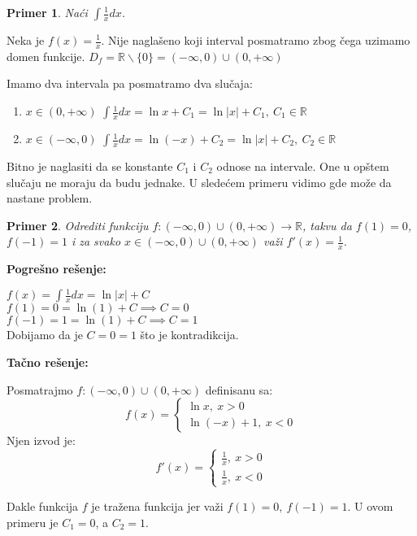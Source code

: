 \documentclass{article}
\newtheorem{prim}{Primer}[section]
\begin{document}
\begin{primbox}
    \begin{prim}
        Naći $\int\frac{1}{x}dx$.
    \end{prim}
    Neka je $f(x) = \frac{1}{x}$.
    Nije naglašeno koji interval posmatramo zbog čega uzimamo domen
    funkcije.
    $D_f= \mathbb{R}\backslash \{0\} =
        (-\infty, 0)\cup(0, +\infty)$\par
    Imamo dva intervala pa posmatramo dva slučaja:
    \begin{enumerate}[leftmargin=2cm, label=\arabic*. slučaj:]
        \item $x \in (0, +\infty)$ $\int \frac{1}{x}dx =
                  \ln x + C_1=\ln|x| + C_1,\ C_1\in\mathbb{R}$
        \item $x \in (-\infty, 0)$ $\int \frac{1}{x}dx =
                  \ln(-x) + C_2=\ln|x| + C_2,\ C_2\in\mathbb{R}$
    \end{enumerate}
\end{primbox}
Bitno je naglasiti da se konstante $C_1$ i $C_2$ odnose na intervale. One
u opštem slučaju ne moraju da budu jednake.
U sledećem primeru vidimo gde može da nastane problem.

\begin{primbox}
    \begin{prim}
        Odrediti funkciju $f: (-\infty, 0)\cup(0, +\infty)
            \longrightarrow \mathbb{R}$, takvu da $f(1) = 0$,
        $f(-1) = 1$ i za svako $x \in (-\infty, 0)
            \cup(0, +\infty)$ važi
        $f'(x) = \frac{1}{x}$.
    \end{prim}
    \textbf{Pogrešno rešenje:}\par
    $f(x) = \int \frac{1}{x}dx = \ln|x| + C$\\
    $f(1) = 0 = \ln(1) + C \implies C = 0$\\
    $f(-1) = 1 = \ln(1) + C \implies C = 1$\\
    Dobijamo da je $C=0=1$ što je kontradikcija.\par
    \textbf{Tačno rešenje:}\par
    Posmatrajmo $f: (-\infty, 0)\cup(0, +\infty)$
    definisanu sa:
    $$
        f(x) =
        \begin{cases}
            \ln x,\ x > 0 \\
            \ln (-x) + 1,\ x < 0
        \end{cases}
    $$
    Njen izvod je:
    $$f'(x) =
        \begin{cases}
            \frac{1}{x},\ x > 0 \\
            \frac{1}{x},\ x < 0
        \end{cases}$$

    Dakle funkcija $f$ je tražena funkcija jer važi
    $f(1) = 0,\ f(-1) = 1$. U ovom primeru je $C_1=0$, a $C_2=1$.
\end{primbox}
\end{document}
